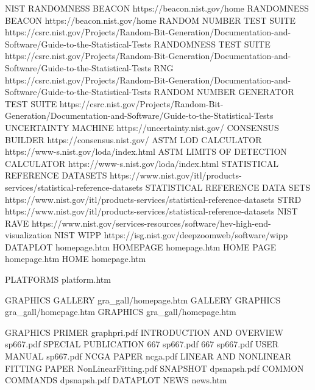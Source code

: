 NIST RANDOMNESS BEACON                  https://beacon.nist.gov/home
RANDOMNESS BEACON                       https://beacon.nist.gov/home
RANDOM NUMBER TEST SUITE                https://csrc.nist.gov/Projects/Random-Bit-Generation/Documentation-and-Software/Guide-to-the-Statistical-Tests
RANDOMNESS TEST SUITE                   https://csrc.nist.gov/Projects/Random-Bit-Generation/Documentation-and-Software/Guide-to-the-Statistical-Tests
RNG                                     https://csrc.nist.gov/Projects/Random-Bit-Generation/Documentation-and-Software/Guide-to-the-Statistical-Tests
RANDOM NUMBER GENERATOR TEST SUITE      https://csrc.nist.gov/Projects/Random-Bit-Generation/Documentation-and-Software/Guide-to-the-Statistical-Tests
UNCERTAINTY MACHINE                     https://uncertainty.nist.gov/
CONSENSUS BUILDER                       https://consensus.nist.gov/
ASTM LOD CALCULATOR                     https://www-s.nist.gov/loda/index.html
ASTM LIMITS OF DETECTION CALCULATOR     https://www-s.nist.gov/loda/index.html
STATISTICAL REFERENCE DATASETS          https://www.nist.gov/itl/products-services/statistical-reference-datasets
STATISTICAL REFERENCE DATA SETS         https://www.nist.gov/itl/products-services/statistical-reference-datasets
STRD                                    https://www.nist.gov/itl/products-services/statistical-reference-datasets
NIST RAVE                               https://www.nist.gov/services-resources/software/hev-high-end-visualization
NIST WIPP                               https://isg.nist.gov/deepzoomweb/software/wipp
DATAPLOT                                homepage.htm
HOMEPAGE                                homepage.htm
HOME PAGE                               homepage.htm
HOME                                    homepage.htm

PLATFORMS                               platform.htm

GRAPHICS GALLERY                        gra_gall/homepage.htm
GALLERY GRAPHICS                        gra_gall/homepage.htm
GRAPHICS                                gra_gall/homepage.htm

GRAPHICS PRIMER                         graphpri.pdf
INTRODUCTION AND OVERVIEW               sp667.pdf
SPECIAL PUBLICATION 667                 sp667.pdf
667                                     sp667.pdf
USER MANUAL                             sp667.pdf
NCGA PAPER                              ncga.pdf
LINEAR AND NONLINEAR FITTING PAPER      NonLinearFitting.pdf
SNAPSHOT                                dpsnapsh.pdf
COMMON COMMANDS                         dpsnapsh.pdf
DATAPLOT NEWS                           news.htm

